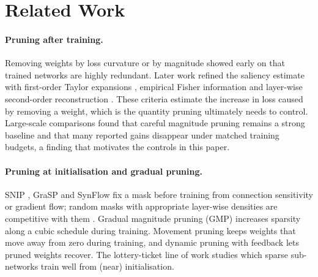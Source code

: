 \section{Related Work}
\label{sec:related}

\paragraph{Pruning after training.}
Removing weights by loss curvature \cite{lecun1989optimal,hassibi1992second} or by magnitude \cite{han2015learning} showed early on that trained networks are highly redundant. Later work refined the saliency estimate with first-order Taylor expansions \cite{molchanov2017pruning,molchanov2019importance}, empirical Fisher information \cite{theis2018faster} and layer-wise second-order reconstruction \cite{frantar2022obc}. These criteria estimate the increase in loss caused by removing a weight, which is the quantity pruning ultimately needs to control. Large-scale comparisons \cite{gale2019state,blalock2020state,hoefler2021sparsity} found that careful magnitude pruning remains a strong baseline and that many reported gains disappear under matched training budgets, a finding that motivates the controls in this paper.

\paragraph{Pruning at initialisation and gradual pruning.}
SNIP \cite{lee2018snip}, GraSP \cite{wang2020picking} and SynFlow \cite{tanaka2020synflow} fix a mask before training from connection sensitivity or gradient flow; random masks with appropriate layer-wise densities are competitive with them \cite{liu2022random}. Gradual magnitude pruning (GMP) \cite{zhu2017prune} increases sparsity along a cubic schedule during training. Movement pruning \cite{sanh2020movement} keeps weights that move away from zero during training, and dynamic pruning with feedback \cite{lin2020dpf} lets pruned weights recover. The lottery-ticket line of work \cite{frankle2018the,renda2020comparing} studies which sparse sub-networks train well from (near) initialisation.

